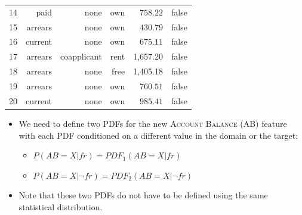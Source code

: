 \documentclass[xcolor={table}]{beamer}
\newcommand{\featN}[1]{\textsc{#1}}
\begin{document}
\begin{frame} [plain]
\begin{table}[!tb]
\begin{tiny}
{\begin{tabular}{crrrrr}
14 & 	paid & 	none & 	own & 	$758.22$ &false\\
15 & 	arrears & 	none & 	own & 	$430.79$ &false\\
16 & 	current & 	none & 	own & 	$675.11$  &false\\
17 & 	arrears & 	coapplicant & 	rent & 	1,657.20 &false\\
18 & 	arrears & 	none & 	free & 	1,405.18 &false\\
19 & 	arrears & 	none & 	own & 	$760.51$ &false\\
20 & 	current & 	none & 	own & $985.41$ &false\\
\hline
\end{tabular}
}
\end{tiny}
\end{table}
\end{frame} 

\begin{frame} 
\begin{itemize}
\item We need to define two PDFs for the new \featN{Account Balance} (AB) feature with each PDF conditioned on a different value in the domain or the target: 
\begin{itemize}
\item $P(AB=X|fr)=PDF_1(AB=X|fr)$ 
\item $P(AB=X|\lnot fr)=PDF_2(AB=X|\lnot fr)$
\end{itemize}
\item Note that these two PDFs do not have to be defined using the same statistical distribution. 
\end{itemize}
\end{frame} 
\end{document}
